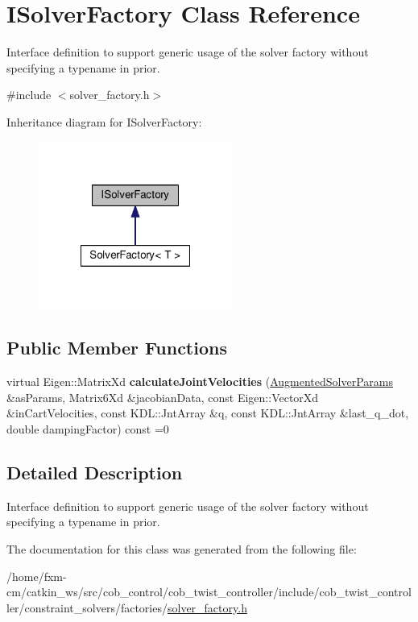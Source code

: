 \hypertarget{classISolverFactory}{\section{I\-Solver\-Factory Class Reference}
\label{classISolverFactory}
}


Interface definition to support generic usage of the solver factory without specifying a typename in prior.  




{\ttfamily \#include $<$solver\-\_\-factory.\-h$>$}



Inheritance diagram for I\-Solver\-Factory\-:
\nopagebreak
\begin{figure}[H]
\begin{center}
\leavevmode
\includegraphics[width=180pt]{classISolverFactory__inherit__graph}
\end{center}
\end{figure}
\subsection*{Public Member Functions}
\begin{DoxyCompactItemize}
\item 
\hypertarget{classISolverFactory_a7b0cccec09597d71cf67da38d7bf6f5b}{virtual Eigen\-::\-Matrix\-Xd {\bfseries calculate\-Joint\-Velocities} (\hyperlink{structAugmentedSolverParams}{Augmented\-Solver\-Params} \&as\-Params, Matrix6\-Xd \&jacobian\-Data, const Eigen\-::\-Vector\-Xd \&in\-Cart\-Velocities, const K\-D\-L\-::\-Jnt\-Array \&q, const K\-D\-L\-::\-Jnt\-Array \&last\-\_\-q\-\_\-dot, double damping\-Factor) const =0}\label{classISolverFactory_a7b0cccec09597d71cf67da38d7bf6f5b}

\end{DoxyCompactItemize}


\subsection{Detailed Description}
Interface definition to support generic usage of the solver factory without specifying a typename in prior. 

The documentation for this class was generated from the following file\-:\begin{DoxyCompactItemize}
\item 
/home/fxm-\/cm/catkin\-\_\-ws/src/cob\-\_\-control/cob\-\_\-twist\-\_\-controller/include/cob\-\_\-twist\-\_\-controller/constraint\-\_\-solvers/factories/\hyperlink{solver__factory_8h}{solver\-\_\-factory.\-h}\end{DoxyCompactItemize}

